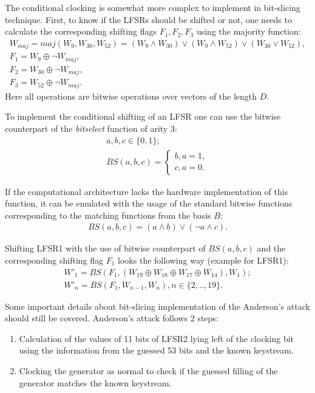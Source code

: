 \documentclass[runningheads,a4paper]{llncs}[2015/06/24]
\begin{document}
The conditional clocking is somewhat more complex to implement in bit-slicing
technique. First, to know if the LFSRs should be shifted or not, one needs to
calculate the corresponding shifting flags $F_1,F_2,F_3$ using the majority
function: 
\begin{gather*} 
	W_{maj}=maj(W_9,W_{30},W_{52})=(W_9 \wedge W_{30}) \vee (W_9 \wedge W_{52}) \vee (W_{30} \vee W_{52}), \\
	F_1 = W_9 \oplus {\neg W_{maj}}, \\
	F_2 = W_{30} \oplus {\neg W_{maj}}, \\
	F_3 = W_{52} \oplus {\neg W_{maj}}.
\end{gather*} 
Here all operations are bitwise operations over vectors of the length $D$.

To implement the conditional shifting of an LFSR one can use the bitwise
counterpart of the \textit{bitselect} function of arity 3: 
\begin{gather*} a,b,c \in \{0,1\}; \\ BS(a,b,c) = \left\lbrace
	\begin{array}{ll} b,a=1, \\ c,a=0.
	\end{array} \right.
\end{gather*} 

If the computational architecture lacks the hardware implementation of this
function, it can be emulated with the usage of the standard bitwise functions
corresponding to the matching functions from the basis $B$:
\begin{gather*} BS(a,b,c) = (a \wedge b) \vee (\neg a \wedge c).
\end{gather*}

Shifting LFSR1 with the use of bitwise counterpart of $BS(a,b,c)$ and the corresponding shifting flag $F_1$
looks the following way (example for LFSR1):
\begin{gather*} 
	W'_1 = BS(F_1, (W_{19} \oplus W_{18} \oplus W_{17} \oplus W_{14}), W_1);
	\\W'_n = BS( F_1, W_{n-1}, W_n), n \in \{2,..,19\}.
\end{gather*}

Some important details about bit-slicing implementation of the Anderson's
attack should still be covered. Anderson's attack follows 2 steps:
\begin{enumerate} 
	\item Calculation of the values of 11 bits of LFSR2 lying left of the
	 clocking bit using the information from the guessed 53 bits and
	 the known keystream.
	\item Clocking the generator as normal to check if the guessed filling of
	 the generator matches the known keystream.
\end{enumerate}
\end{document}
